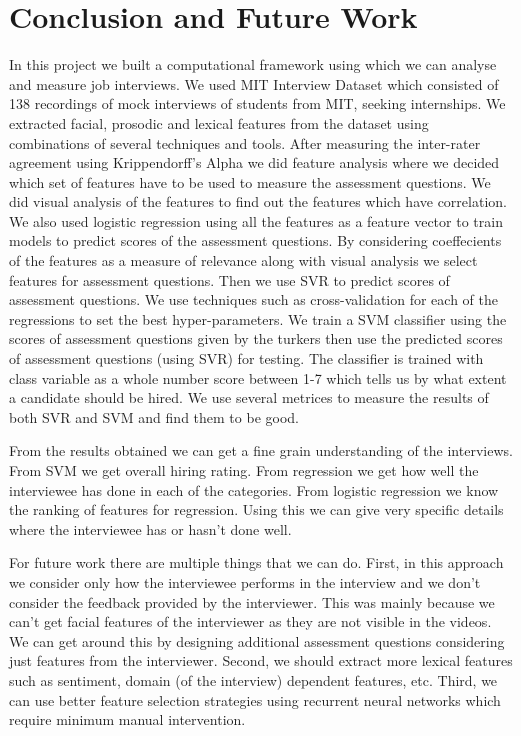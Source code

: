 \documentclass[11pt]{article}
\begin{document}
\section{Conclusion and Future Work}
In this project we built a computational framework using which we can analyse and measure job interviews. We used MIT Interview Dataset which consisted of 138 recordings of mock interviews of students from MIT, seeking internships. We extracted facial, prosodic and lexical features from the dataset using combinations of several techniques and tools. After measuring the inter-rater agreement using Krippendorff's Alpha we did feature analysis where we decided which set of features have to be used to measure the assessment questions. We did visual analysis of the features to find out the features which have correlation. We also used logistic regression using all the features as a feature vector to train models to predict scores of the assessment questions. By considering coeffecients of the features as a measure of relevance along with visual analysis we select features for assessment questions. Then we use SVR to predict scores of assessment questions. We use techniques such as cross-validation for each of the regressions to set the best hyper-parameters. We train a SVM classifier using the scores of assessment questions given by the turkers then use the predicted scores of assessment questions (using SVR) for testing. The classifier is trained with class variable as a whole number score between 1-7 which tells us by what extent a candidate should be hired. We use several metrices to measure the results of both SVR and SVM and find them to be good.

From the results obtained we can get a fine grain understanding of the interviews. From SVM we get overall hiring rating. From regression we get how well the interviewee has done in each of the categories. From logistic regression we know the ranking of features for regression. Using this we can give very specific details where the interviewee has or hasn’t done well.

For future work there are multiple things that we can do. First, in this approach we consider only how the interviewee performs in the interview and we don't consider the feedback provided by the interviewer. This was mainly because we can't get facial features of the interviewer as they are not visible in the videos. We can get around this by designing additional assessment questions considering just features from the interviewer. Second, we should extract more lexical features such as sentiment, domain (of the interview) dependent features, etc. Third, we can use better feature selection strategies using recurrent neural networks which require minimum manual intervention.
\end{document}
